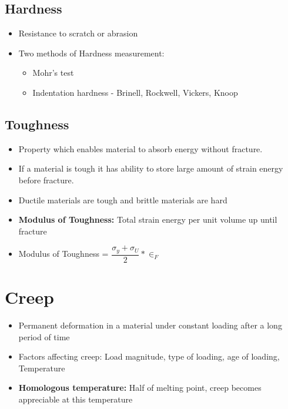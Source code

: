\documentclass[8pt]{report}
\begin{document}
	\subsection{Hardness}
		\begin{itemize}
			\item Resistance to scratch or abrasion
			\item Two methods of Hardness measurement:
				\begin{itemize}
					\item Mohr's test
					\item Indentation hardness - Brinell, Rockwell, Vickers, Knoop
				\end{itemize}
		\end{itemize}\hrulefill	%
	\subsection{Toughness}
		\begin{itemize}
			\item Property which enables material to absorb energy without fracture.
			\item If a material is tough it has ability to store large amount of strain energy before fracture. 
			\item Ductile materials are tough and brittle materials are hard
			\item \textbf{Modulus of Toughness: }Total strain energy per unit volume up until fracture
			\item Modulus of Toughness = $\boxed{\dfrac{\sigma_y+\sigma_U}{2}*\in_F}$
		\end{itemize}\hrulefill
	\section{Creep}
		\begin{itemize}
			\item Permanent deformation in a material under constant loading after a long period of time
			\item Factors affecting creep: Load magnitude, type of loading, age of loading, Temperature
			\item \textbf{Homologous temperature: } Half of melting point, creep becomes appreciable at this temperature
		\end{itemize}\hrulefill
\end{document}
